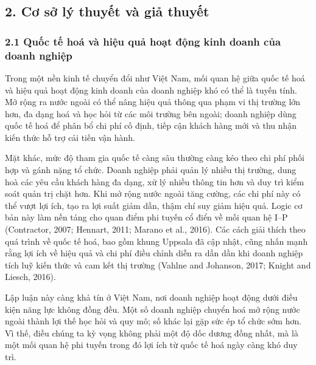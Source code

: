 \documentclass[12pt,a4paper]{article}
\begin{document}
\hypertarget{2-cux1a1-sux1edf-luxfd-thuyux1ebft-vuxe0-giux1ea3-thuyux1ebft}{%
\subsection{2. Cơ sở lý thuyết và giả
thuyết}\label{2-cux1a1-sux1edf-luxfd-thuyux1ebft-vuxe0-giux1ea3-thuyux1ebft}}

\hypertarget{21-quux1ed1c-tux1ebf-houxe1-vuxe0-hiux1ec7u-quux1ea3-houx1ea1t-ux111ux1ed9ng-kinh-doanh-cux1ee7a-doanh-nghiux1ec7p}{%
\subsubsection{2.1 Quốc tế hoá và hiệu quả hoạt động kinh doanh của
doanh
nghiệp}\label{21-quux1ed1c-tux1ebf-houxe1-vuxe0-hiux1ec7u-quux1ea3-houx1ea1t-ux111ux1ed9ng-kinh-doanh-cux1ee7a-doanh-nghiux1ec7p}}

Trong một nền kinh tế chuyển đổi như Việt Nam, mối quan hệ giữa quốc tế
hoá và hiệu quả hoạt động kinh doanh của doanh nghiệp khó có thể là
tuyến tính. Mở rộng ra nước ngoài có thể nâng hiệu quả thông qua phạm vi
thị trường lớn hơn, đa dạng hoá và học hỏi từ các môi trường bên ngoài;
doanh nghiệp dùng quốc tế hoá để phân bổ chi phí cố định, tiếp cận khách
hàng mới và thu nhận kiến thức hỗ trợ cải tiến vận hành.

Mặt khác, mức độ tham gia quốc tế càng sâu thường càng kéo theo chi phí
phối hợp và gánh nặng tổ chức. Doanh nghiệp phải quản lý nhiều thị
trường, dung hoà các yêu cầu khách hàng đa dạng, xử lý nhiều thông tin
hơn và duy trì kiểm soát quản trị chặt hơn. Khi mở rộng nước ngoài tăng
cường, các chi phí này có thể vượt lợi ích, tạo ra lợi suất giảm dần,
thậm chí suy giảm hiệu quả. Logic cơ bản này làm nền tảng cho quan điểm
phi tuyến cổ điển về mối quan hệ I--P (Contractor, 2007; Hennart, 2011;
Marano et al., 2016). Các cách giải thích theo quá trình về quốc tế hoá,
bao gồm khung Uppsala đã cập nhật, cũng nhấn mạnh rằng lợi ích về hiệu
quả và chi phí điều chỉnh diễn ra dần dần khi doanh nghiệp tích luỹ kiến
thức và cam kết thị trường (Vahlne and Johanson, 2017; Knight and
Liesch, 2016).

Lập luận này càng khả tín ở Việt Nam, nơi doanh nghiệp hoạt động dưới
điều kiện năng lực không đồng đều. Một số doanh nghiệp chuyển hoá mở
rộng nước ngoài thành lợi thế học hỏi và quy mô; số khác lại gặp sức ép
tổ chức sớm hơn. Vì thế, điều chúng ta kỳ vọng không phải một độ dốc
dương đồng nhất, mà là một mối quan hệ phi tuyến trong đó lợi ích từ
quốc tế hoá ngày càng khó duy trì.
\end{document}
